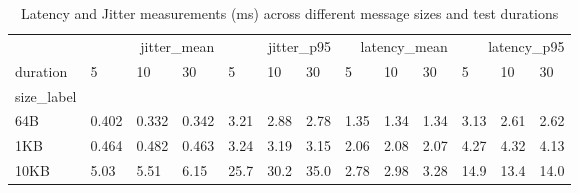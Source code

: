 \begin{table}[htbp]
\caption{Latency and Jitter measurements (ms) across different message sizes and test durations}
\label{tab:latency_jitter}
\begin{tabular}{lllllllllllll}
\toprule
 & \multicolumn{3}{r}{jitter_mean} & \multicolumn{3}{r}{jitter_p95} & \multicolumn{3}{r}{latency_mean} & \multicolumn{3}{r}{latency_p95} \\
duration & 5 & 10 & 30 & 5 & 10 & 30 & 5 & 10 & 30 & 5 & 10 & 30 \\
size_label &  &  &  &  &  &  &  &  &  &  &  &  \\
\midrule
64B & 0.402 & 0.332 & 0.342 & 3.21 & 2.88 & 2.78 & 1.35 & 1.34 & 1.34 & 3.13 & 2.61 & 2.62 \\
1KB & 0.464 & 0.482 & 0.463 & 3.24 & 3.19 & 3.15 & 2.06 & 2.08 & 2.07 & 4.27 & 4.32 & 4.13 \\
10KB & 5.03 & 5.51 & 6.15 & 25.7 & 30.2 & 35.0 & 2.78 & 2.98 & 3.28 & 14.9 & 13.4 & 14.0 \\
\bottomrule
\end{tabular}
\end{table}
